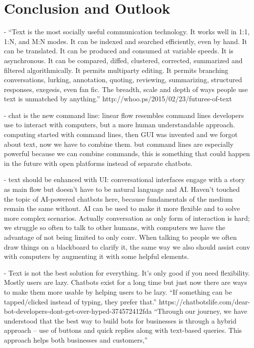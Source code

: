 \chapter{Conclusion and Outlook}


- ``Text is the most socially useful communication technology. It works well in 1:1, 1:N, and M:N modes. It can be indexed and searched efficiently, even by hand. It can be translated. It can be produced and consumed at variable speeds. It is asynchronous. It can be compared, diffed, clustered, corrected, summarized and filtered algorithmically. It permits multiparty editing. It permits branching conversations, lurking, annotation, quoting, reviewing, summarizing, structured responses, exegesis, even fan fic. The breadth, scale and depth of ways people use text is unmatched by anything.''
  http://whoo.ps/2015/02/23/futures-of-text

- chat is the new command line:
  linear flow resembles command lines developers use to interact with computers,
  but a more human understandable approach.
  computing started with command lines, then GUI was invented and we forgot about text, now we have to combine them.
  but command lines are especially powerful because we can combine commands,
  this is something that could happen in the future with open platforms instead of separate chatbots.

- text should be enhanced with UI:
  conversational interfaces engage with a story as main flow
  but doesn't have to be natural language and AI.
  Haven't touched the topic of AI-powered chatbots here,
  because fundamentals of the medium remain the same without.
  AI can be used to make it more flexible and to solve more complex scenarios.
  Actually conversation as only form of interaction is hard;
  we struggle so often to talk to other humans,
  with computers we have the advantage of not being limited to only conv.
  When talking to people we often draw things on a blackboard to clarify it,
  the same way we also should assist conv with computers by augmenting it with some helpful elements.

- Text is not the best solution for everything. It's only good if you need flexibility.
  Mostly users are lazy.
  Chatbots exist for a long time but just now there are ways to make them more usable by helping users to be lazy.
  ``If something can be tapped/clicked instead of typing, they prefer that.''
  https://chatbotslife.com/dear-bot-developers-dont-get-over-hyped-374572412fda
  ``Through our journey, we have understood that the best way to build bots for businesses is through a hybrid approach – use of buttons and quick replies along with text-based queries. This approach helps both businesses and customers,''\cite{techinasia}

